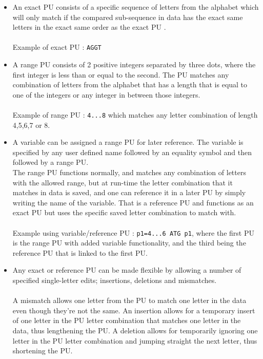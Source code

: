 \documentclass[12pt]{article}
\newcommand{\pu}{PU }
\newcommand{\pup}{PU. }
\begin{document}
\begin{itemize}
\item An exact \pu consists of a specific sequence of letters from the alphabet which will
only match if the compared sub-sequence in data has the exact same letters in the exact same order as the 
exact \pu. \\ \\
Example of exact \pu : \texttt{AGGT}
\item A range \pu consists of 2 positive integers separated by three dots, where the first integer is less than or
equal to the second. The \pu matches any combination of
letters from the alphabet that has a length that is equal to one of the integers or any integer in between those integers. \\ \\
Example of range \pu : \texttt{4...8} which matches any letter combination of length 4,5,6,7 or 8.
\item A variable can be assigned a range \pu for later reference. The variable is specified by 
any user defined name
followed by an equality symbol and then followed by a range \pup \\
The range \pu functions normally, and matches any combination of letters with the allowed range, 
but at run-time the letter combination that it matches
in data is saved, and one can reference it in a later \pu by simply writing the name of the variable. That is a
reference \pu and functions as an exact \pu but uses the specific saved 
letter combination to match with. \\ \\
Example using variable/reference \pu : \texttt{p1=4...6\; ATG\; p1}, where
the first \pu is the range \pu with added variable functionality, 
and the third being the reference \pu that is linked to the first \pup
\item Any exact or reference \pu can be made flexible by allowing a number of specified
single-letter edits; insertions, deletions and mismatches. \\ \\
A mismatch allows one letter from the \pu to match one letter in the data even though they're not the same.
An insertion allows for a temporary insert of one letter in the \pu letter combination that matches one letter in
the data, thus lengthening the \pup A deletion allows for temporarily ignoring one letter in the \pu letter combination
and jumping straight the next letter, thus shortening the \pup \\ \\

\end{itemize}
\end{document}
